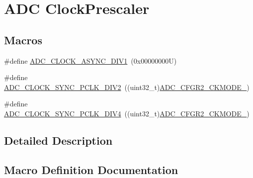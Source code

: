 \hypertarget{group___a_d_c___clock_prescaler}{}\section{A\+DC Clock\+Prescaler}
\label{group___a_d_c___clock_prescaler}
\subsection*{Macros}
\begin{DoxyCompactItemize}
\item 
\#define \hyperlink{group___a_d_c___clock_prescaler_ga092c0277fd6db9b905d229c9f8dda8ab}{A\+D\+C\+\_\+\+C\+L\+O\+C\+K\+\_\+\+A\+S\+Y\+N\+C\+\_\+\+D\+I\+V1}~(0x00000000\+U)
\item 
\#define \hyperlink{group___a_d_c___clock_prescaler_ga71571b183aa6d0ddbaeef8a1da11d00a}{A\+D\+C\+\_\+\+C\+L\+O\+C\+K\+\_\+\+S\+Y\+N\+C\+\_\+\+P\+C\+L\+K\+\_\+\+D\+I\+V2}~((uint32\+\_\+t)\hyperlink{group___peripheral___registers___bits___definition_ga8603cb9fe211cb7cda8b29049dcde908}{A\+D\+C\+\_\+\+C\+F\+G\+R2\+\_\+\+C\+K\+M\+O\+D\+E\+\_})
\item 
\#define \hyperlink{group___a_d_c___clock_prescaler_ga41b6a6d1cdf7806ec1e5790fc7fdc651}{A\+D\+C\+\_\+\+C\+L\+O\+C\+K\+\_\+\+S\+Y\+N\+C\+\_\+\+P\+C\+L\+K\+\_\+\+D\+I\+V4}~((uint32\+\_\+t)\hyperlink{group___peripheral___registers___bits___definition_gadd8d90fdb7639030c0816d24f27cad4b}{A\+D\+C\+\_\+\+C\+F\+G\+R2\+\_\+\+C\+K\+M\+O\+D\+E\+\_})
\end{DoxyCompactItemize}


\subsection{Detailed Description}


\subsection{Macro Definition Documentation}
\mbox{\label{group___a_d_c___clock_prescaler_ga092c0277fd6db9b905d229c9f8dda8ab}} 
